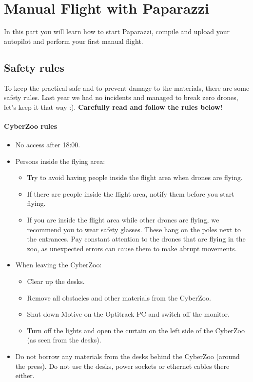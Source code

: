 \chapter{Manual Flight with Paparazzi}
\label{ch:manual_flight}
In this part you will learn how to start Paparazzi, compile and upload your autopilot and perform your first manual flight.

\section{Safety rules}
To keep the practical safe and to prevent damage to the materials, there are some safety rules.
Last year we had no incidents and managed to break zero drones, let's keep it that way :).
\textbf{Carefully read and follow the rules below!}

\subsubsection*{CyberZoo rules}
\begin{itemize}
	\item No access after 18:00.
	\item Persons inside the flying area:
	\begin{itemize}
		\item Try to avoid having people inside the flight area when drones are flying.
		\item If there are people inside the flight area, notify them before you start flying.
		\item If you are inside the flight area while other drones are flying, we recommend you to wear safety glasses. These hang on the poles next to the entrances. Pay constant attention to the drones that are flying in the zoo, as unexpected errors can cause them to make abrupt movements.
	\end{itemize}
	\item When leaving the CyberZoo:
	\begin{itemize}
		\item Clear up the desks.
		\item Remove all obstacles and other materials from the CyberZoo.
		\item Shut down Motive on the Optitrack PC and switch off the monitor.
		\item Turn off the lights and open the curtain on the left side of the CyberZoo (as seen from the desks).
	\end{itemize}
	\item Do not borrow any materials from the desks behind the CyberZoo (around the press). Do not use the desks, power sockets or ethernet cables there either.
\end{itemize}

